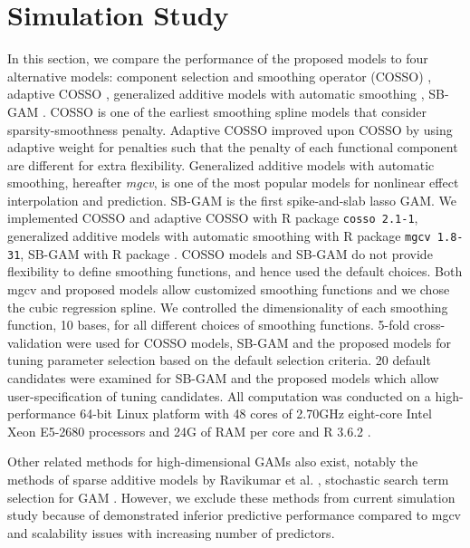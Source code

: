 \documentclass[AMA,STIX1COL,]{WileyNJD-v2}
\begin{document}
\hypertarget{simulation-study}{%
\section{Simulation Study}\label{simulation-study}}

\label{sec:sim}

In this section, we compare the performance of the proposed models to
four alternative models: component selection and smoothing operator
(COSSO) \citep{Zhang2006GAM}, adaptive COSSO \citep{Storlie2011},
generalized additive models with automatic smoothing \citep{Wood2011},
SB-GAM \citep{Bai2021}. COSSO is one of the earliest smoothing spline
models that consider sparsity-smoothness penalty. Adaptive COSSO
improved upon COSSO by using adaptive weight for penalties such that the
penalty of each functional component are different for extra
flexibility. Generalized additive models with automatic smoothing,
hereafter \textit{mgcv}, is one of the most popular models for nonlinear
effect interpolation and prediction. SB-GAM is the first spike-and-slab
lasso GAM. We implemented COSSO and adaptive COSSO with R package
\texttt{cosso 2.1-1}, generalized additive models with automatic
smoothing with R package \texttt{mgcv 1.8-31}, SB-GAM with R package
. COSSO models and SB-GAM do not provide flexibility
to define smoothing functions, and hence used the default choices. Both
mgcv and proposed models allow customized smoothing functions and we
chose the cubic regression spline. We controlled the dimensionality of
each smoothing function, 10 bases, for all different choices of
smoothing functions. 5-fold cross-validation were used for COSSO models,
SB-GAM and the proposed models for tuning parameter selection based on
the default selection criteria. 20 default candidates were examined for
SB-GAM and the proposed models which allow user-specification of tuning
candidates. All computation was conducted on a high-performance 64-bit
Linux platform with 48 cores of 2.70GHz eight-core Intel Xeon E5-2680
processors and 24G of RAM per core and R 3.6.2 \citep{R}.

Other related methods for high-dimensional GAMs also exist, notably the
methods of sparse additive models by Ravikumar et al.
\citep{Ravikumar2009}, stochastic search term selection for GAM
\citep{Scheipl2012}. However, we exclude these methods from current
simulation study because of demonstrated inferior predictive performance
compared to mgcv and scalability issues with increasing number of
predictors. \citep{Scheipl2013}
\end{document}
